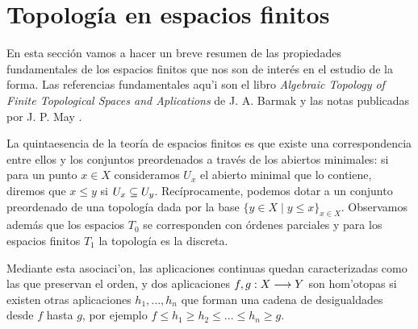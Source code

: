 \chapter{Topología en espacios finitos}\label{espaciosfinitos}
En esta sección vamos a hacer un breve resumen de las propiedades fundamentales de los espacios finitos que nos son de interés en el estudio de la forma. Las referencias fundamentales aqu'i son el libro \textit{Algebraic Topology of Finite Topological Spaces and Aplications} de J. A. Barmak \cite{barmak2011algebraic} y las notas publicadas por J. P. May \cite{jpmayfinitespaces}. 

La quintaesencia de la teoría de espacios finitos es que existe una correspondencia entre ellos y los conjuntos preordenados a través de los abiertos minimales: si para un punto $ x\in X  $ consideramos $ U_x  $ el abierto minimal que lo contiene, diremos que $ x\leq y  $ si $ U _{x } \subseteq U_y  $. Recíprocamente, podemos dotar a un conjunto preordenado de una topología dada por la base $ \{y\in X\mid y\leq x \}_{x\in X } $. Observamos además que los espacios $ T _{0 }  $ se corresponden con órdenes parciales y para los espacios finitos $ T_1  $ la topología es la discreta. 

Mediante esta asociaci'on, las aplicaciones continuas quedan caracterizadas como las que preservan el orden, y dos aplicaciones $f,g :X\longrightarrow Y $ son hom'otopas si existen otras aplicaciones $h_1,...,h_n$ que forman una cadena de desigualdades desde $f$ hasta $g$, por ejemplo $f\leq h_1\geq h_2\leq ... \leq h_n\geq g$.


